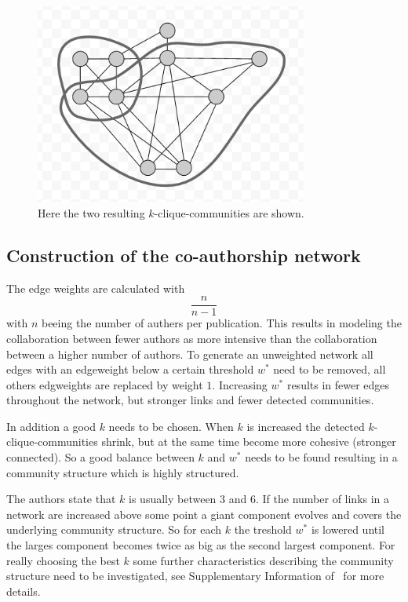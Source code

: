 \documentclass[runningheads,a4paper]{llncs}
\begin{document}
\begin{figure}
\begin{center}
	\includegraphics[width=0.8\textwidth]{result}
		\caption{Here the two resulting $k$-clique-communities are shown.}
		\label{fig:result}
\end{center}
\end{figure}


\subsection{Construction of the co-authorship network}
\label{cpm-construction}
The edge weights are calculated with $$\frac{n}{n-1}$$ with $n$ beeing the number of authers per publication.
This results in modeling the collaboration between fewer authors as more intensive than the collaboration between a higher number of authors.  
To generate an unweighted network all edges with an edgeweight below a certain threshold $w^*$ need to be removed, all others edgweights are replaced by weight $1$. Increasing $w^*$ results in fewer edges throughout the network, but stronger links and fewer detected communities.

In addition a good $k$ needs to be chosen. When $k$ is increased the detected $k$-clique-communities shrink, but at the same time become more cohesive (stronger connected).
So a good balance between $k$ and $w^*$ needs to be found resulting in a community structure which is highly structured.

The authors state that $k$ is usually between $3$ and $6$.
If the number of links in a network are increased above some point a giant component evolves and covers the underlying community structure.
So for each $k$ the treshold $w^*$ is lowered until the larges component becomes twice as big as the second largest component. For really choosing the best $k$ some further characteristics describing the community structure need to be investigated, see Supplementary Information of~\cite{palla2005uncovering} for more details.
\end{document}
